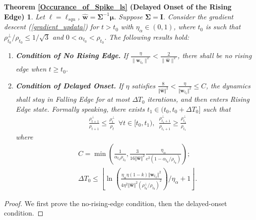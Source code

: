 \documentclass[pdflatex,sn-basic]{sn-jnl}%
\theoremstyle{thmstyleone}%
\begin{document}
\begin{appendices}
\newtheorem*{restate_Occurance_of_Spike_ls}{Theorem \ref{Occurance_of_Spike_ls} (Delayed Onset of the Rising Edge)}
\begin{restate_Occurance_of_Spike_ls}
  Let $\ell = \ell_{squ}$, $\hat{\mathbf{w}} = \mathbf{\Sigma}^{-1} \boldsymbol{\mu}$. Suppose $\mathbf{\Sigma} = \mathbf{I}$. 
  Consider the gradient descent (\ref{gradient_updata}) 
  for $t > t_0$ with $\eta_{\alpha} \in (0, 1)$, where $t_0$ is such that 
  $\rho_{t_0}^{\perp} / \rho_{t_0} \le 1/\sqrt{3}$ and $0 < \alpha_{t_0} < \rho_{t_0}$. The following results hold:
  \begin{enumerate}
    \item \textbf{Condition of No Rising Edge.} 
    If $\frac{\eta}{\| \mathbf{w}_{t_0} \|^2} < \frac{2}{\| \hat{\mathbf{w}} \|^2}$, there shall be no rising edge when $t \ge t_0$.
    \item \textbf{Condition of Delayed Onset.}
    If $\eta$ satisfies $\frac{8 }{\Vert \hat{\mathbf{w}} \Vert^2} 
    < 
    \frac{\eta}{\Vert \mathbf{w}_{t_0} \Vert^{2}} 
    \le 
    C$, 
    the dynamics shall stay in \textit{Falling Edge} for at most $\Delta T_0$ iterations, 
    and then enters \textit{Rising Edge} state. 
    Formally speaking, there exists $t_1 \in (t_0, t_0 + \Delta T_0]$ such that 
    \begin{equation*}
    \begin{aligned}
      & \frac{\rho_{t+1}^{\perp}}{\rho_{t+1}} \le \frac{\rho_{t}^{\perp}}{\rho_{t}} \ \ \forall t \in [t_0, t_1), 
      \ \ 
      \frac{\rho_{t_1+1}^{\perp}}{\rho_{t_1+1}} \ge \frac{\rho_{t_1}^{\perp}}{\rho_{t_1}}
    \end{aligned}
    \end{equation*}
    where 
    \begin{equation*}
    \begin{aligned}
    & C = 
    \min \left(
      \frac{1}{\alpha_{t_0} \rho_{t_0}},
      \frac{3}{16\Vert \hat{\mathbf{w}} \Vert^2}
      \frac{\eta_\alpha}{e^{2} \left( 1 - \alpha_{t_0}/\rho_{t_0} \right)}
    \right);
    \\ & \Delta T_0 \le 
      \left\lfloor
        \ln
        \left(
          \frac{ \eta_{\alpha} \eta \left( 1 - k \right) \Vert \mathbf{w}_{t_0} \Vert^2}{4 
          \eta^{2} \Vert \hat{\mathbf{w}} \Vert^2 \left(\rho_{t_0}^{\perp} / \rho_{t_0}\right)^2 }
        \right) 
        / \eta_\alpha
        + 1
      \right\rfloor.
    \end{aligned}
    \end{equation*}
  \end{enumerate} 
\end{restate_Occurance_of_Spike_ls}
\begin{proof} We first prove the no-rising-edge condition, then the delayed-onset condition.


\end{proof}
\end{appendices}
\end{document}
